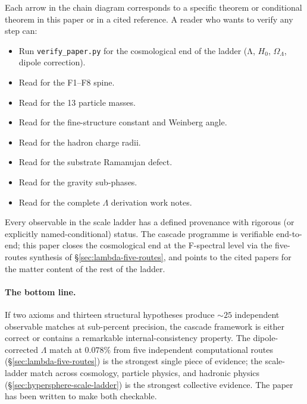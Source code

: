 \documentclass[11pt]{article}
\theoremstyle{plain}
\theoremstyle{definition}
\theoremstyle{remark}
\begin{document}
Each arrow in the chain diagram corresponds to a specific theorem or conditional theorem in this paper or in a cited reference. A reader who wants to verify any step can:
\begin{itemize}[leftmargin=2em]
\item Run \texttt{verify\_paper.py} for the cosmological end of the ladder (Λ, $H_0$, $\Omega_\Lambda$, dipole correction).
\item Read \citet{SmartXXXVI} for the F1--F8 spine.
\item Read \citet{SmartV} for the 13 particle masses.
\item Read \citet{SmartXXII} for the fine-structure constant and Weinberg angle.
\item Read \citet{SmartXXXII} for the hadron charge radii.
\item Read \citet{rhTwoSphere} for the substrate Ramanujan defect.
\item Read \citet{cascadeGR} for the gravity sub-phases.
\item Read \citet{cascadeLambda} for the complete $\Lambda$ derivation work notes.
\end{itemize}

Every observable in the scale ladder has a defined provenance with rigorous (or explicitly named-conditional) status. The cascade programme is verifiable end-to-end; this paper closes the cosmological end at the F-spectral level via the five-routes synthesis of \S\ref{sec:lambda-five-routes}, and points to the cited papers for the matter content of the rest of the ladder.

\paragraph{The bottom line.} If two axioms and thirteen structural hypotheses produce $\sim 25$ independent observable matches at sub-percent precision, the cascade framework is either correct or contains a remarkable internal-consistency property. The dipole-corrected $\Lambda$ match at $0.078\%$ from five independent computational routes (\S\ref{sec:lambda-five-routes}) is the strongest single piece of evidence; the scale-ladder match across cosmology, particle physics, and hadronic physics (\S\ref{sec:hypersphere-scale-ladder}) is the strongest collective evidence. The paper has been written to make both checkable.



\end{document}
